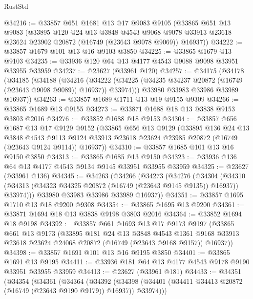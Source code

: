 \begin{lexlean}{RustStd}
\begin{coremodule}
@34216 := @33857
    @651
    @1681
    @13
    @17
    @9083
    @9105
    (@33865
      @651
      @13
      @9083
      (@33895
        @120
        @24
        @13
        @3848
        @4543
        @9068
        @9078
        @33913
        @23618
        @23624
        @23902
        @20872
        (@16749 (@23643 @9078 @9069))
        @16937))
@34222 := @33857 @1679 @101 @13 @16 @9103 @3850
@34225 := @33865 @1679 @13 @9103
@34235 := @33936 @120 @64 @13 @4177 @4543 @9088 @9098 @33951 @33955 @33959
@34237 := @23627 (@33961 @120)
@34257 := @34175
    (@34178
      (@34185
        (@34188
          (@34216
            (@34222 (@34225 (@34235 @34237 @20872 (@16749 (@23643 @9098 @9089)) @16937)) @33974)))
        @33980
        @33983
        @33986
        @33989
        @16937))
@34263 := @33857 @1689 @1711 @13 @19 @9155 @9309
@34266 := @33865 @1689 @13 @9155
@34273 := @33871 @1688 @18 @13 @3838 @9153 @3803 @2016
@34276 := @33852 @1688 @18 @9153
@34304 := @33857
    @656
    @1687
    @13
    @17
    @9129
    @9152
    (@33865
      @656
      @13
      @9129
      (@33895
        @136
        @24
        @13
        @3848
        @4543
        @9113
        @9124
        @33913
        @23618
        @23624
        @23985
        @20872
        (@16749 (@23643 @9124 @9114))
        @16937))
@34310 := @33857 @1685 @101 @13 @16 @9150 @3850
@34313 := @33865 @1685 @13 @9150
@34323 := @33936 @136 @64 @13 @4177 @4543 @9134 @9145 @33951 @33955 @33959
@34325 := @23627 (@33961 @136)
@34345 := @34263
    (@34266
      (@34273
        (@34276
          (@34304
            (@34310 (@34313 (@34323 @34325 @20872 (@16749 (@23643 @9145 @9135)) @16937)) @33974)))
        @33980
        @33983
        @33986
        @33989
        @16937))
@34351 := @33857 @1695 @1710 @13 @18 @9200 @9308
@34354 := @33865 @1695 @13 @9200
@34361 := @33871 @1694 @18 @13 @3838 @9198 @3803 @2016
@34364 := @33852 @1694 @18 @9198
@34392 := @33857
    @661
    @1693
    @13
    @17
    @9173
    @9197
    (@33865
      @661
      @13
      @9173
      (@33895
        @181
        @24
        @13
        @3848
        @4543
        @1361
        @9168
        @33913
        @23618
        @23624
        @24068
        @20872
        (@16749 (@23643 @9168 @9157))
        @16937))
@34398 := @33857 @1691 @101 @13 @16 @9195 @3850
@34401 := @33865 @1691 @13 @9195
@34411 := @33936 @181 @64 @13 @4177 @4543 @9178 @9190 @33951 @33955 @33959
@34413 := @23627 (@33961 @181)
@34433 := @34351
    (@34354
      (@34361
        (@34364
          (@34392
            (@34398 (@34401 (@34411 @34413 @20872 (@16749 (@23643 @9190 @9179)) @16937)) @33974)))

\end{coremodule}
\end{lexlean}
